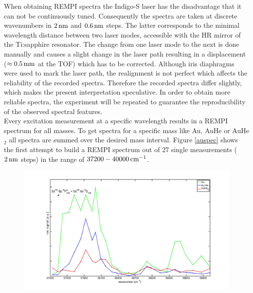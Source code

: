 \documentclass[parskip,12pt,headsepline,a4paper] {scrbook}
\begin{document}
When obtaining REMPI spectra the Indigo-S laser has the disadvantage that it can not be continuously tuned. Consequently the spectra are taken at discrete wavenumbers in $\unit[2]{nm}$ and $\unit[0.6]{nm}$ steps. The latter corresponds to the minimal wavelength distance between two laser modes, accessible with the HR mirror of the Ti:sapphire resonator. The change from one laser mode to the next is done manually and causes a slight change in the laser path resulting in a displacement ($\approx \unit[0.5]{mm}$ at the TOF) which has to be corrected. Although iris diaphragms were used to mark the laser path, the realignment is not perfect which affects the reliability of the recorded spectra.
Therefore the recorded spectra differ slightly, which makes the present interpretation speculative. In order to obtain more reliable spectra, the experiment will be repeated to guarantee the reproducibility of the observed spectral features. \\
Every excitation measurement at a specific wavelength results in a REMPI spectrum for all masses. To get spectra for a specific mass like Au, AuHe or AuHe$_2$ all spectra are summed over the desired mass interval. Figure \ref{auspec} shows the first attempt to build a REMPI spectrum out of 27 single measurements ($\unit[2]{nm}$ steps) in the range of $\unit[37200-40000]{cm^{-1}}$.

\begin{figure}[ht]
\centerline{
\includegraphics[width=17cm]{./results/au_spec_new.jpg}}
\end{figure}
\end{document}
